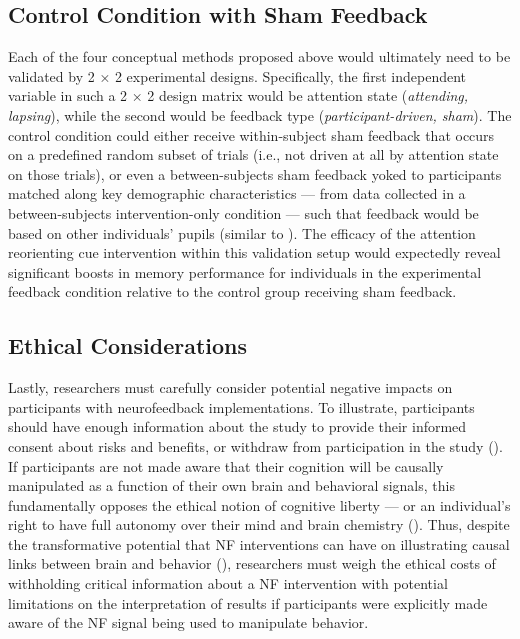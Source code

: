 \subsection{Control Condition with Sham Feedback}
Each of the four conceptual methods proposed above would ultimately need to be validated by 2 × 2 experimental designs. Specifically, the first independent variable in such a 2 × 2 design matrix would be attention state (\emph{attending, lapsing}), while the second would be feedback type (\emph{participant-driven, sham}). The control condition could either receive within-subject sham feedback that occurs on a predefined random subset of trials (i.e., not driven at all by attention state on those trials), or even a between-subjects sham feedback yoked to participants matched along key demographic characteristics --- from data collected in a between-subjects intervention-only condition --- such that feedback would be based on other individuals’ pupils (similar to \cite{megan2015closed}). The efficacy of the attention reorienting cue intervention within this validation setup would expectedly reveal significant boosts in memory performance for individuals in the experimental feedback condition relative to the control group receiving sham feedback.

\subsection{Ethical Considerations}
Lastly, researchers must carefully consider potential negative impacts on participants with neurofeedback implementations. To illustrate, participants should have enough information about the study to provide their informed consent about risks and benefits, or withdraw from participation in the study (\cite{cherkaoui2021ethical}). If participants are not made aware that their cognition will be causally manipulated as a function of their own brain and behavioral signals, this fundamentally opposes the ethical notion of cognitive liberty --- or an individual's right to have full autonomy over their mind and brain chemistry (\cite{lavazza2018freedom, bublitz2013my, sententia2004neuroethical}). Thus, despite the transformative potential that NF interventions can have on illustrating causal links between brain and behavior (\cite{cherkaoui2021ethical}), researchers must weigh the ethical costs of withholding critical information about a NF intervention with potential limitations on the interpretation of results if participants were explicitly made aware of the NF signal being used to manipulate behavior.

